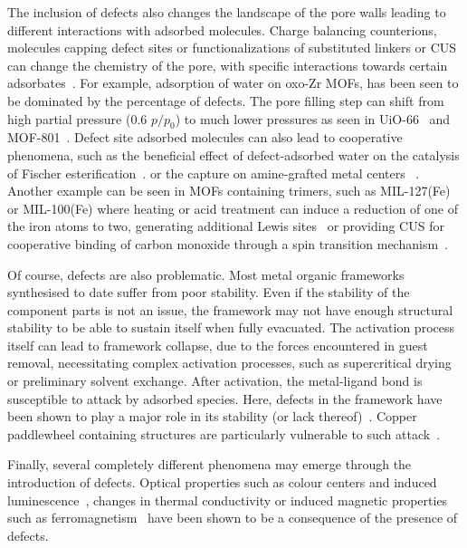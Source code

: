 The inclusion of defects also changes the landscape of the pore 
walls leading to different interactions with adsorbed molecules.
Charge balancing counterions, molecules capping defect sites or
functionalizations of substituted linkers or CUS can change the 
chemistry of the pore, with specific interactions towards certain 
adsorbates~\cite{dissegnaUsingWaterAdsorption2017}.
For example, adsorption of water on oxo-Zr MOFs, has been seen to 
be dominated by the percentage of defects. The pore filling step can
shift from high partial pressure (0.6 \(p/p_0\)) to much lower pressures
as seen in UiO-66~\cite{ghoshWaterAdsorptionUiO662014} and 
MOF-801~\cite{choiRoleStructuralDefects2018}. Defect site adsorbed
molecules can also lead to cooperative phenomena, 
such as the beneficial effect of defect-adsorbed water on the
catalysis of Fischer esterification~\cite{caratelliNatureActiveSites2017}.
or the  capture on amine-grafted metal centers
~\cite{mcdonaldCooperativeInsertionCO22015}.
Another example can be seen in MOFs containing  trimers,
such as MIL-127(Fe) or MIL-100(Fe) where heating or acid treatment
can induce a reduction of one of the iron atoms to two, generating
additional Lewis sites~\cite{yoonControlledReducibilityMetalOrganic2010}
or providing CUS for cooperative binding of carbon monoxide through
a spin transition mechanism~\cite{reedSpinTransitionMechanism2017}. 

Of course, defects are also problematic. Most metal organic frameworks
synthesised to date suffer from poor stability. Even if the stability
of the component parts is not an issue, the framework may not have 
enough structural stability to be able to sustain itself when fully
evacuated. The activation process itself can lead to framework 
collapse, due to the forces encountered in guest removal, necessitating 
complex activation processes, such as supercritical drying or 
preliminary solvent exchange. After activation, the metal-ligand bond
is susceptible to attack by adsorbed species. Here, defects in the framework 
have been shown to play a major role in its stability (or lack 
thereof)~\cite{burtchWaterStabilityAdsorption2014}.
Copper paddlewheel containing structures are particularly vulnerable to 
such attack~\cite{alvarezStructureStabilityHKUST12017}.

Finally, several completely different phenomena may emerge through
the introduction of defects. Optical properties such as colour 
centers and induced luminescence~\cite{mullerDefectsColorCenters2017},
changes in thermal conductivity or induced magnetic properties
such as ferromagnetism~\cite{shenOriginLongRangeFerromagnetic2012}
have been shown to be a consequence of the presence of defects.

